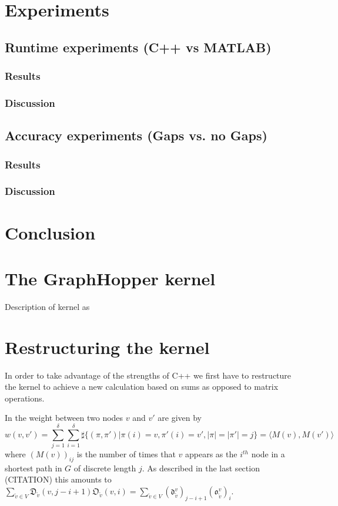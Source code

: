 \documentclass{article}
\begin{document}
\section{Experiments}
\subsection{Runtime experiments (C++ vs MATLAB)}
\subsubsection{Results}
\subsubsection{Discussion}
\subsection{Accuracy experiments (Gaps vs. no Gaps)}
\subsubsection{Results}
\subsubsection{Discussion}

\section{Conclusion}


\iffalse
\section{The GraphHopper kernel}
Description of kernel as 


\section{Restructuring the kernel}
In order to take advantage of the strengths of C++ we first have to restructure the kernel to achieve a new calculation based on sums as opposed to matrix operations.

In \cite{graphhopper} the weight between two nodes $v$ and $v'$ are given by
\begin{equation}
w(v,v')=\sum_{j=1}^{\delta}\sum_{i=1}^{\delta}\sharp\{(\pi, \pi')|\pi(i)=v,\pi'(i)=v',|\pi|=|\pi'|=j\}=\langle M(v),M(v')\rangle
\end{equation}
where $(M(v))_{ij}$ is the number of times that $v$ appears as the $i^{th}$ node in a shortest path in $G$ of discrete length $j$. As described in the last section (CITATION) this amounts to $\sum_{\tilde{v}\in V}\mathfrak{D}_{\tilde{v}}(v,j-i+1)\mathfrak{O}_{\tilde{v}}(v,i) = \sum_{\tilde{v}\in V}(\mathfrak{d}_{\tilde{v}}^v)_{j-i+1}(\mathfrak{o}_{\tilde{v}}^v)_i$.
\end{document}
